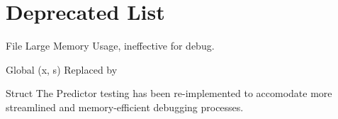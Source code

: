 \chapter{Deprecated List}
\hypertarget{deprecated}{}\label{deprecated}

\begin{DoxyRefList}
\item[File \doxylink{cache__predictor_8h}{cache\+\_\+predictor.h} ]\label{deprecated__deprecated000001}%
%
Large Memory Usage, ineffective for debug.  
\item[Global \doxylink{stream__encoder_8h_abc23dc7967a47b4db3efff8237ef3a2f}{L\+\_\+\+SHIFT} (x, s)]\label{deprecated__deprecated000003}%
%
Replaced by   
\item[Struct \doxylink{struct_predictor_cache}{Predictor\+Cache} ]\label{deprecated__deprecated000002}%
%
 The Predictor testing has been re-\/implemented to accomodate more streamlined and memory-\/efficient debugging processes.
\end{DoxyRefList}